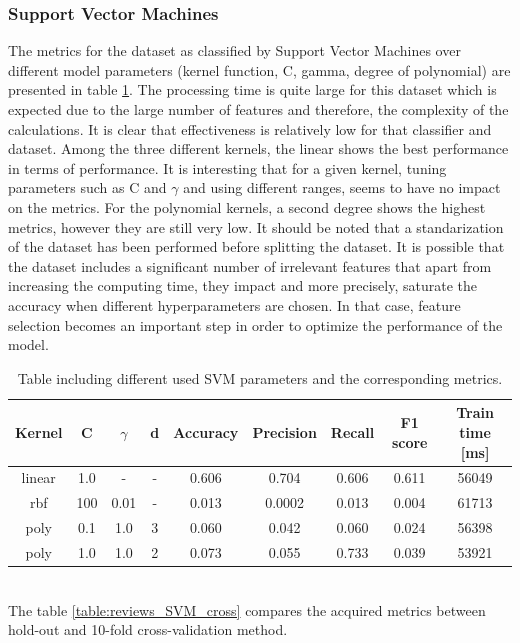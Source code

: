 \documentclass{article}
\begin{document}
\subsubsection*{Support Vector Machines}

The metrics for the dataset as classified by Support Vector Machines over different model parameters (kernel function, C, gamma, degree of polynomial) are presented in table \ref{table:reviews_SVM}. The processing time is quite large for this dataset which is expected due to the large number of features and therefore, the complexity of the calculations. It is clear that effectiveness is relatively low for that classifier and dataset. Among the three different kernels, the linear shows the best performance in terms of performance. It is interesting that for a given kernel, tuning parameters such as C and $\gamma$ and using different ranges, seems to have no impact on the metrics. For the polynomial kernels, a second degree shows the highest metrics, however they are still very low. It should be noted that a standarization of the dataset has been performed before splitting the dataset. It is possible that the dataset includes a significant number of irrelevant features that apart from increasing the computing time, they impact and more precisely, saturate the accuracy when different hyperparameters are chosen. In that case, feature selection becomes an important step in order to optimize the performance of the model. 
\begin{table}[h!]
\centering
\begin{tabular}{||c c c c c c c c c||} 
 \hline
 Kernel & C & $\gamma$ &d & Accuracy & Precision & Recall & F1 score & Train time [ms]\\ [0.5ex] 
 \hline\hline
 linear & 1.0 & - & - & 0.606 & 0.704 & 0.606 & 0.611 &56049\\ 
 rbf & 100 & 0.01 & - & 0.013 & 0.0002 & 0.013 & 0.004 & 61713\\
 poly & 0.1 &  1.0 & 3 & 0.060 & 0.042 & 0.060 & 0.024 & 56398\\
 poly & 1.0 &  1.0&  2 & 0.073 & 0.055 & 0.733 & 0.039& 53921 \\ [1ex] 
 \hline
\end{tabular}
\caption{Table including different used SVM parameters and the corresponding metrics.}
\label{table:reviews_SVM}
\end{table}
\\
The table \ref{table:reviews_SVM_cross} compares the acquired metrics between hold-out and 10-fold cross-validation method. 
\end{document}
